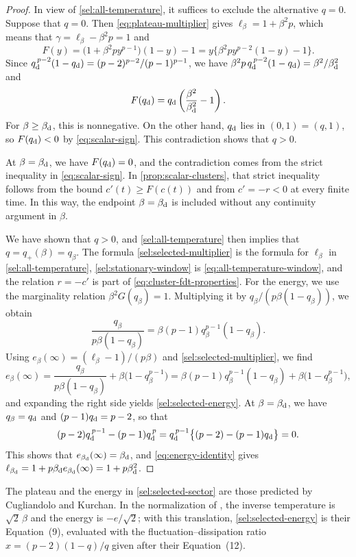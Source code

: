 \begin{proof}
In view of \cref{sel:all-temperature}, it suffices to exclude the alternative $q=0$. Suppose that $q=0$. Then \eqref{eq:plateau-multiplier} gives $\ell_\beta=1+\beta^2p$, which means that $\gamma=\ell_\beta-\beta^2p=1$ and
\[
 F(y)=\bigl(1+\beta^2py^{p-1}\bigr)(1-y)-1
 =y\bigl\{\beta^2py^{p-2}(1-y)-1\bigr\}.
\]
Since $q_{\mathrm d}^{\,p-2}(1-q_{\mathrm d})=(p-2)^{p-2}/(p-1)^{p-1}$, we have $\beta^2p\,q_{\mathrm d}^{\,p-2}(1-q_{\mathrm d})=\beta^2/\beta_{\mathrm d}^2$ and
\[
 F(q_{\mathrm d})=q_{\mathrm d}\left(\frac{\beta^2}{\beta_{\mathrm d}^2}-1\right).
\]
For $\beta\ge\beta_{\mathrm d}$, this is nonnegative. On the other hand, $q_{\mathrm d}$ lies in $(0,1)=(q,1)$, so $F(q_{\mathrm d})<0$ by \eqref{eq:scalar-sign}. This contradiction shows that $q>0$.

At $\beta=\beta_{\mathrm d}$, we have $F(q_{\mathrm d})=0$, and the contradiction comes from the strict inequality in \eqref{eq:scalar-sign}. In \cref{prop:scalar-clusters}, that strict inequality follows from the bound $c'(t)\ge F(c(t))$ and from $c'=-r<0$ at every finite time. In this way, the endpoint $\beta=\beta_{\mathrm d}$ is included without any continuity argument in $\beta$.

We have shown that $q>0$, and \cref{sel:all-temperature} then implies that $q=q_+(\beta)=q_\beta$. The formula \eqref{sel:selected-multiplier} is the formula for $\ell_\beta$ in \cref{sel:all-temperature}, \eqref{sel:stationary-window} is \eqref{eq:all-temperature-window}, and the relation $r=-c'$ is part of \eqref{eq:cluster-fdt-properties}. For the energy, we use the marginality relation $\beta^2G(q_\beta)=1$. Multiplying it by $q_\beta/(p\beta(1-q_\beta))$, we obtain
\[
 \frac{q_\beta}{p\beta(1-q_\beta)}=\beta(p-1)q_\beta^{p-1}(1-q_\beta).
\]
Using $e_\beta(\infty)=(\ell_\beta-1)/(p\beta)$ and \eqref{sel:selected-multiplier}, we find
\[
 e_\beta(\infty)
 =\frac{q_\beta}{p\beta(1-q_\beta)}+\beta\bigl(1-q_\beta^{p-1}\bigr)
 =\beta(p-1)q_\beta^{p-1}(1-q_\beta)+\beta\bigl(1-q_\beta^{p-1}\bigr),
\]
and expanding the right side yields \eqref{sel:selected-energy}. At $\beta=\beta_{\mathrm d}$, we have $q_\beta=q_{\mathrm d}$ and $(p-1)q_{\mathrm d}=p-2$, so that
\[
 (p-2)q_{\mathrm d}^{\,p-1}-(p-1)q_{\mathrm d}^{\,p}=q_{\mathrm d}^{\,p-1}\bigl\{(p-2)-(p-1)q_{\mathrm d}\bigr\}=0.
\]
This shows that $e_{\beta_{\mathrm d}}(\infty)=\beta_{\mathrm d}$, and \eqref{eq:energy-identity} gives $\ell_{\beta_{\mathrm d}}=1+p\beta_{\mathrm d} e_{\beta_{\mathrm d}}(\infty)=1+p\beta_{\mathrm d}^2$.
\end{proof}

The plateau and the energy in \cref{sel:selected-sector} are those predicted by Cugliandolo and Kurchan. In the normalization of \cite{ck1993}, the inverse temperature is $\sqrt2\,\beta$ and the energy is $-e/\sqrt2$; with this translation, \eqref{sel:selected-energy} is their Equation~(9), evaluated with the fluctuation--dissipation ratio $x=(p-2)(1-q)/q$ given after their Equation~(12).

